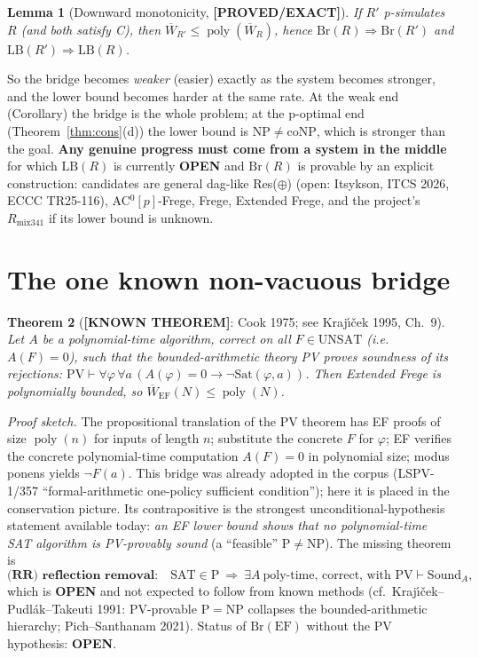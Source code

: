 \documentclass[11pt]{article}
\newtheorem{theorem}{Theorem}
\newtheorem{lemma}[theorem]{Lemma}
\theoremstyle{definition}
\theoremstyle{remark}
\newcommand{\SAT}{\mathrm{SAT}}
\newcommand{\UNSAT}{\mathrm{UNSAT}}
\newcommand{\Br}{\mathrm{Br}}
\newcommand{\LB}{\mathrm{LB}}
\newcommand{\poly}{\operatorname{poly}}
\newcommand{\status}[1]{\textbf{[#1]}}
\begin{document}
\begin{lemma}[Downward monotonicity, \status{PROVED/EXACT}]
If $R'$ p-simulates $R$ (and both satisfy C), then $\overline W_{R'}\le\poly(\overline W_R)$, hence
$\Br(R)\Rightarrow\Br(R')$ and $\LB(R')\Rightarrow\LB(R)$.
\end{lemma}
So the bridge becomes \emph{weaker} (easier) exactly as the system becomes stronger, and the lower bound
becomes harder at the same rate. At the weak end (Corollary) the bridge is the whole problem; at the
p-optimal end (Theorem~\ref{thm:cons}(d)) the lower bound is $\mathrm{NP}\ne\mathrm{coNP}$, which is
stronger than the goal. \textbf{Any genuine progress must come from a system in the middle} for which
$\LB(R)$ is currently \textbf{OPEN} and $\Br(R)$ is provable by an explicit construction:
candidates are general dag-like Res($\oplus$) (open: Itsykson, ITCS 2026, ECCC TR25-116), AC$^0[p]$-Frege,
Frege, Extended Frege, and the project's $R_{\mathrm{mix341}}$ if its lower bound is unknown.

\section{The one known non-vacuous bridge}
\begin{theorem}[\status{KNOWN THEOREM}: Cook 1975; see Kraj\'\i\v{c}ek 1995, Ch.~9]
Let $A$ be a polynomial-time algorithm, correct on all $F\in\UNSAT$ (i.e.\ $A(F)=0$), such that the
bounded-arithmetic theory PV proves soundness of its rejections:
$\mathrm{PV}\vdash\forall\varphi\,\forall a\,(A(\varphi)=0\to\neg\mathrm{Sat}(\varphi,a))$.
Then Extended Frege is polynomially bounded, so $\overline W_{\mathrm{EF}}(N)\le\poly(N)$.
\end{theorem}
\noindent\emph{Proof sketch.} The propositional translation of the PV theorem has EF proofs of size
$\poly(n)$ for inputs of length $n$; substitute the concrete $F$ for $\varphi$; EF verifies the concrete
polynomial-time computation $A(F)=0$ in polynomial size; modus ponens yields $\neg F(a)$.
This bridge was already adopted in the corpus (LSPV-1/357 ``formal-arithmetic one-policy sufficient
condition''); here it is placed in the conservation picture. Its contrapositive is the strongest
unconditional-hypothesis statement available today: \emph{an EF lower bound shows that no
polynomial-time SAT algorithm is PV-provably sound} (a ``feasible'' P$\ne$NP). The missing theorem is
\[
\textbf{(RR) reflection removal:}\quad \SAT\in\mathrm P\ \Longrightarrow\ \exists A\ \text{poly-time, correct, with }
\mathrm{PV}\vdash\mathrm{Sound}_A,
\]
which is \textbf{OPEN} and not expected to follow from known methods (cf.\ Kraj\'\i\v{c}ek--Pudl\'ak--Takeuti 1991:
PV-provable $\mathrm{P}=\mathrm{NP}$ collapses the bounded-arithmetic hierarchy; Pich--Santhanam 2021).
Status of $\Br(\mathrm{EF})$ without the PV hypothesis: \textbf{OPEN}.
\end{document}
